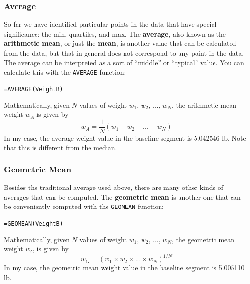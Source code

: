 \subsubsection{Average}
So far we have identified particular points in the data that have special significance: the min, quartiles, and max. The \textbf{average}, also known as the \textbf{arithmetic mean}, or just the \textbf{mean}, is another value that can be calculated from the data, but that in general does not correspond to any point in the data. The average can be interpreted as a sort of ``middle'' or ``typical'' value. You can calculate this with the \texttt{AVERAGE} function:
\begin{center}
    \texttt{=AVERAGE(WeightB)}
\end{center}
Mathematically, given $N$ values of weight $w_{1}$, $w_{2}$, ..., $w_{N}$, the arithmetic mean weight $w_{A}$ is given by
\begin{equation}
    w_{A} = \frac{1}{N} \left( w_{1} + w_{2} + ... + w_{N} \right)
\end{equation}
In my case, the average weight value in the baseline segment is 5.042546 lb. Note that this is different from the median.
\subsubsection{Geometric Mean}
Besides the traditional average used above, there are many other kinds of averages that can be computed. The \textbf{geometric mean} is another one that can be conveniently computed with the \texttt{GEOMEAN} function:
\begin{center}
    \texttt{=GEOMEAN(WeightB)}
\end{center}
Mathematically, given $N$ values of weight $w_{1}$, $w_{2}$, ..., $w_{N}$, the geometric mean weight $w_{G}$ is given by
\begin{equation}
    w_{G} = \left( w_{1} \times w_{2} \times ... \times w_{N} \right)^{1/N}
\end{equation}
In my case, the geometric mean weight value in the baseline segment is 5.005110 lb.
